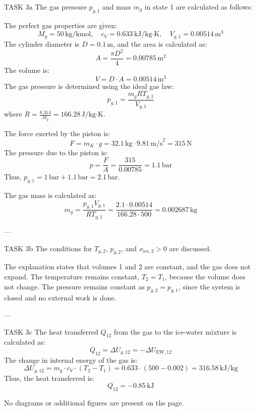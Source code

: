 TASK 3a  
The gas pressure \( p_{g,1} \) and mass \( m_g \) in state 1 are calculated as follows:  

The perfect gas properties are given:  
\[
M_g = 50 \, \text{kg/kmol}, \quad c_V = 0.633 \, \text{kJ/kg·K}, \quad V_{g,1} = 0.00514 \, \text{m}^3
\]  
The cylinder diameter is \( D = 0.1 \, \text{m} \), and the area is calculated as:  
\[
A = \frac{\pi D^2}{4} = 0.00785 \, \text{m}^2
\]  
The volume is:  
\[
V = D \cdot A = 0.00514 \, \text{m}^3
\]  
The gas pressure is determined using the ideal gas law:  
\[
p_{g,1} = \frac{m_g R T_{g,1}}{V_{g,1}}
\]  
where \( R = \frac{8.314}{M_g} = 166.28 \, \text{J/kg·K} \).  

The force exerted by the piston is:  
\[
F = m_K \cdot g = 32.1 \, \text{kg} \cdot 9.81 \, \text{m/s}^2 = 315 \, \text{N}
\]  
The pressure due to the piston is:  
\[
p = \frac{F}{A} = \frac{315}{0.00785} = 1.1 \, \text{bar}
\]  
Thus, \( p_{g,1} = 1 \, \text{bar} + 1.1 \, \text{bar} = 2.1 \, \text{bar} \).  

The gas mass is calculated as:  
\[
m_g = \frac{p_{g,1} V_{g,1}}{R T_{g,1}} = \frac{2.1 \cdot 0.00514}{166.28 \cdot 500} = 0.002687 \, \text{kg}
\]  

---

TASK 3b  
The conditions for \( T_{g,2} \), \( p_{g,2} \), and \( x_{\text{ice},2} > 0 \) are discussed.  

The explanation states that volumes 1 and 2 are constant, and the gas does not expand. The temperature remains constant, \( T_2 = T_1 \), because the volume does not change. The pressure remains constant as \( p_{g,2} = p_{g,1} \), since the system is closed and no external work is done.  

---

TASK 3c  
The heat transferred \( Q_{12} \) from the gas to the ice-water mixture is calculated as:  
\[
Q_{12} = \Delta U_{g,12} = -\Delta U_{\text{EW},12}
\]  
The change in internal energy of the gas is:  
\[
\Delta U_{g,12} = m_g \cdot c_V \cdot (T_2 - T_1) = 0.633 \cdot (500 - 0.002) = 316.58 \, \text{kJ/kg}
\]  
Thus, the heat transferred is:  
\[
Q_{12} = -0.85 \, \text{kJ}
\]  

No diagrams or additional figures are present on the page.